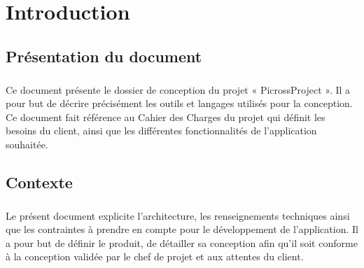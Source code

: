 
\newcommand{\titre}{{\Huge Dossier de conception}\\Groupe B}
\newcommand{\titrehead}{Dossier de conception}




\maketitle
\tableofcontents




\chapter{Introduction}


\section{Présentation du document}
        \paragraph*{}
        Ce document présente le dossier de conception du projet « PicrossProject ». Il a pour
	but de décrire précisément les outils et langages utilisés pour la conception.
	Ce document fait référence au Cahier des Charges du projet qui définit les
	besoins du client, ainsi que les différentes fonctionnalités de l’application souhaitée.

\section{Contexte}
        \paragraph*{}
        Le présent document explicite l’architecture, les renseignements techniques
	ainsi que les contraintes à prendre en compte pour le développement de
	l’application.
	Il a pour but de définir le produit, de détailler sa conception afin qu’il soit
	conforme à la conception validée par le chef de projet et aux attentes du client.




